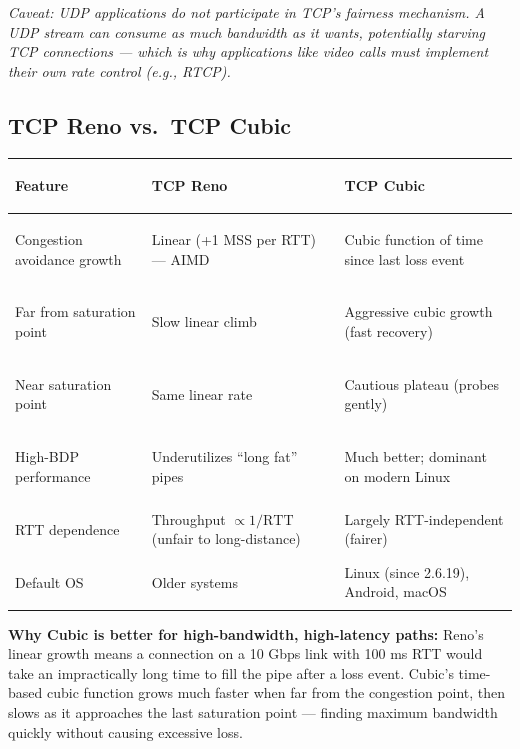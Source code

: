 \documentclass[11pt, letterpaper]{article}
\begin{document}
\textit{Caveat: UDP applications do not participate in TCP's fairness mechanism. A UDP
stream can consume as much bandwidth as it wants, potentially starving TCP connections ---
which is why applications like video calls must implement their own rate control (e.g., RTCP).}

\subsection*{TCP Reno vs.\ TCP Cubic}

\noindent
{\renewcommand{\arraystretch}{1.6}
\begin{tabularx}{\textwidth}{>{\bfseries\raggedright\arraybackslash}p{3.5cm}
                              >{\raggedright\arraybackslash}X
                              >{\raggedright\arraybackslash}X}
\toprule
\rowcolor{tableheaderteal}
\textbf{Feature} & \textbf{TCP Reno} & \textbf{TCP Cubic} \\
\midrule
\rowcolor{rowTe} Congestion avoidance growth & Linear (+1 MSS per RTT) --- AIMD & Cubic function of time since last loss event \\
\rowcolor{rowA}  Far from saturation point & Slow linear climb & Aggressive cubic growth (fast recovery) \\
\rowcolor{rowTe} Near saturation point & Same linear rate & Cautious plateau (probes gently) \\
\rowcolor{rowA}  High-BDP performance & Underutilizes ``long fat'' pipes & Much better; dominant on modern Linux \\
\rowcolor{rowTe} RTT dependence & Throughput $\propto 1/\text{RTT}$ (unfair to long-distance) & Largely RTT-independent (fairer) \\
\rowcolor{rowA}  Default OS & Older systems & Linux (since 2.6.19), Android, macOS \\
\bottomrule
\end{tabularx}}

\begin{tcolorbox}[colback=part5bg, colframe=sectionteal, arc=3pt, boxrule=1pt]
\textbf{Why Cubic is better for high-bandwidth, high-latency paths:} Reno's linear growth
means a connection on a 10 Gbps link with 100 ms RTT would take an impractically long time
to fill the pipe after a loss event. Cubic's time-based cubic function grows much faster
when far from the congestion point, then slows as it approaches the last saturation point ---
finding maximum bandwidth quickly without causing excessive loss.
\end{tcolorbox}
\end{document}
